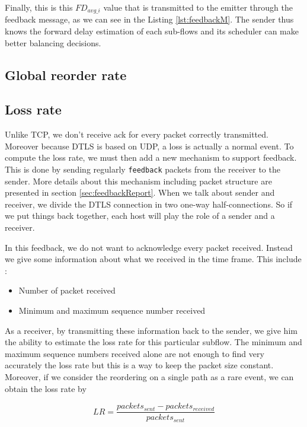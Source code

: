 \documentclass[11pt,a4paper,oldfontcommands]{memoir}
\begin{document}
Finally, this is this $FD_{avg\_i}$ value that is transmitted to the emitter through the feedback message, as we can see in the Listing \ref{lst:feedbackM}. The sender thus knows the forward delay estimation of each sub-flows and its scheduler can make better balancing decisions.

\subsection{Global reorder rate}


\subsection{Loss rate}

Unlike TCP, we don't receive ack for every packet correctly transmitted. Moreover because DTLS is based on UDP, a loss is actually a normal event. To compute the loss rate, we must then add a new mechanism to support feedback. This is done by sending regularly \verb!feedback! packets from the receiver to the sender. More details about this mechanism including packet structure are presented in section \ref{sec:feedbackReport}. When we talk about sender and receiver, we divide the DTLS connection in two one-way half-connections. So if we put things back together, each host will play the role of a sender and a receiver.

In this feedback, we do not want to acknowledge every packet received. Instead we give some information about what we received in the time frame. This include : 

\begin{itemize}
\item Number of packet received
\item Minimum and maximum sequence number received
\end{itemize}

As a receiver, by transmitting these information back to the sender, we give him the ability to estimate the loss rate for this particular subflow. The minimum and maximum sequence numbers received alone are not enough to find very accurately the loss rate but this is a way to keep the packet size constant. Moreover, if we consider the reordering on a single path as a rare event, we can obtain the loss rate by 

\begin{equation*}
LR = \frac{packets_{sent} - packets_{received}}{packets_{sent}}
\end{equation*}
\end{document}
